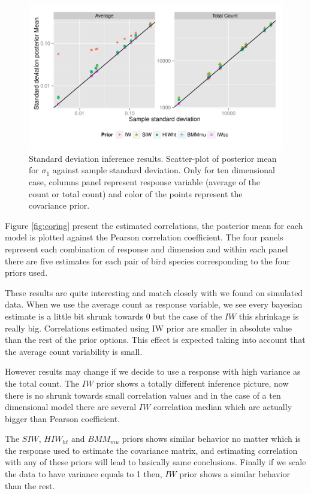 \documentclass{article}
\begin{document}
\begin{figure}[hbpt]
\centering
\includegraphics[width=\textwidth]{resvar}
 \vspace{-.5in}
\caption{Standard deviation inference results. Scatter-plot of posterior mean for $\sigma_1$  against sample standard deviation. Only for ten dimensional case, columns panel represent response variable (average of the count or total count)  and color of the points represent the covariance prior. \label{birdsd}  }
\end{figure}

Figure \ref{fig:coring} present the estimated correlations, the posterior mean for each model is plotted against the Pearson correlation coefficient. The four panels represent each combination of response and dimension and within each panel there are five estimates for each pair of bird species corresponding to the four priors used. 

These results are quite interesting and match closely with we found on simulated data. When we use the average count as response variable, we see every bayesian estimate is a little bit shrunk towards 0 but the case of the $IW$ this shrinkage is really big. Correlations estimated using IW prior are smaller in absolute value than the rest of the prior options. This effect is expected taking into account that the average count variability is small. 

However results may change if we decide to use a response with high variance as the total count. The $IW$ prior shows a totally different inference picture, now there is no shrunk towards small correlation values and in the case of a ten dimensional model there are several $IW$ correlation median which are actually bigger than Pearson coefficient. 

The $SIW$, $HIW_{ht}$ and $BMM_{mu}$ priors shows similar behavior no matter which is the response used to estimate the covariance matrix, and estimating correlation with any of these priors will lead to basically same conclusions. Finally if we scale the data to have variance equals to 1 then, $IW$ prior shows a similar behavior than the rest.
\end{document}
